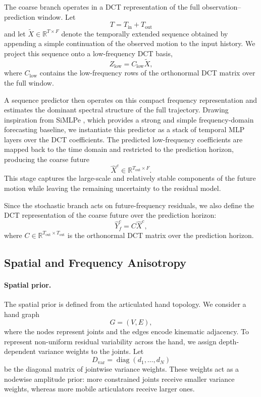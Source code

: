 The coarse branch operates in a DCT representation of the full observation--prediction window. Let
\[
T = T_{\mathrm{in}} + T_{\mathrm{out}}
\]
and let $\tilde{X} \in \mathbb{R}^{T \times F}$ denote the temporally extended sequence obtained by appending a simple continuation of the observed motion to the input history. We project this sequence onto a low-frequency DCT basis,
\[
Z_{\mathrm{low}} = C_{\mathrm{low}} \tilde{X},
\]
where $C_{\mathrm{low}}$ contains the low-frequency rows of the orthonormal DCT matrix over the full window.

A sequence predictor then operates on this compact frequency representation and estimates the dominant spectral structure of the full trajectory. Drawing inspiration from SiMLPe \cite{Guo2023SiMLPe}, which provides a strong and simple frequency-domain forecasting baseline, we instantiate this predictor as a stack of temporal MLP layers over the DCT coefficients. The predicted low-frequency coefficients are mapped back to the time domain and restricted to the prediction horizon, producing the coarse future
\[
\hat{X}^{c} \in \mathbb{R}^{T_{\mathrm{out}} \times F}.
\]
This stage captures the large-scale and relatively stable components of the future motion while leaving the remaining uncertainty to the residual model.

Since the stochastic branch acts on future-frequency residuals, we also define the DCT representation of the coarse future over the prediction horizon:
\[
\hat{Y}^{c}_{f} = C \hat{X}^{c},
\]
where $C \in \mathbb{R}^{T_{\mathrm{out}} \times T_{\mathrm{out}}}$ is the orthonormal DCT matrix over the prediction horizon.

\subsection{Spatial and Frequency Anisotropy}
\label{sec:method_anisotropy}

\paragraph{Spatial prior.}
The spatial prior is defined from the articulated hand topology. We consider a hand graph
\[
G = (V,E),
\]
where the nodes represent joints and the edges encode kinematic adjacency. To represent non-uniform residual variability across the hand, we assign depth-dependent variance weights to the joints. Let
\[
D_{\mathrm{var}} = \operatorname{diag}(d_1,\dots,d_N)
\]
be the diagonal matrix of jointwise variance weights. These weights act as a nodewise amplitude prior: more constrained joints receive smaller variance weights, whereas more mobile articulators receive larger ones.

